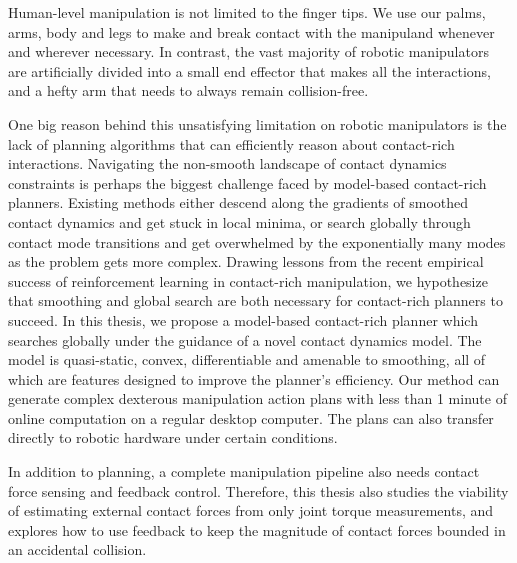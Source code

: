 % 
% 
%

Human-level manipulation is not limited to the finger tips. We use our palms, arms, body and legs to make and break contact with the manipuland whenever and wherever necessary. 
In contrast, the vast majority of robotic manipulators are artificially divided into a small end effector that makes all the interactions, and a hefty arm that needs to always remain collision-free.

One big reason behind this unsatisfying limitation on robotic manipulators is the lack of planning algorithms that can efficiently reason about contact-rich interactions. 
Navigating the non-smooth landscape of contact dynamics constraints is perhaps the biggest challenge faced by model-based contact-rich planners. 
Existing methods either descend along the gradients of smoothed contact dynamics and get stuck in local minima, or search globally through contact mode transitions and get overwhelmed by the exponentially many modes as the problem gets more complex. 
Drawing lessons from the recent empirical success of reinforcement learning in contact-rich manipulation, we hypothesize that smoothing and global search are both necessary for contact-rich planners to succeed. 
In this thesis, we propose a model-based contact-rich planner which searches globally under the guidance of a novel contact dynamics model. The model is quasi-static, convex, differentiable and amenable to smoothing, all of which are features designed to improve the planner's efficiency.
Our method can generate complex dexterous manipulation action plans with less than 1 minute of online computation on a regular desktop computer. The plans can also transfer directly to robotic hardware under certain conditions.

In addition to planning, a complete manipulation pipeline also needs contact force sensing and feedback control. Therefore, this thesis also studies the viability of estimating external contact forces from only joint torque measurements, and explores how to use feedback to keep the magnitude of contact forces bounded in an accidental collision. 
